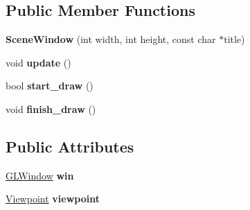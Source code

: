 \subsection*{Public Member Functions}
\begin{DoxyCompactItemize}
\item 
\mbox{\label{classglwindow_1_1_scene_window_a41959b518db30a3ab785492f1ac010fd}} 
{\bfseries Scene\+Window} (int width, int height, const char $\ast$title)
\item 
\mbox{\label{classglwindow_1_1_scene_window_a2e960ccafe493ce9e71418a03bf88301}} 
void {\bfseries update} ()
\item 
\mbox{\label{classglwindow_1_1_scene_window_af3c36c90d57620298fd2796ced9af848}} 
bool {\bfseries start\+\_\+draw} ()
\item 
\mbox{\label{classglwindow_1_1_scene_window_ab0688f7612cdaa8b06b86a3979abcdf4}} 
void {\bfseries finish\+\_\+draw} ()
\end{DoxyCompactItemize}
\subsection*{Public Attributes}
\begin{DoxyCompactItemize}
\item 
\mbox{\label{classglwindow_1_1_scene_window_a0946d9bab275dab533fe778af5d3ec7a}} 
\hyperlink{classglwindow_1_1_g_l_window}{G\+L\+Window} {\bfseries win}
\item 
\mbox{\label{classglwindow_1_1_scene_window_aac5dd0d07cb2dd42aa044622c6d7de6b}} 
\hyperlink{structglwindow_1_1_scene_window_1_1_viewpoint}{Viewpoint} {\bfseries viewpoint}
\end{DoxyCompactItemize}
